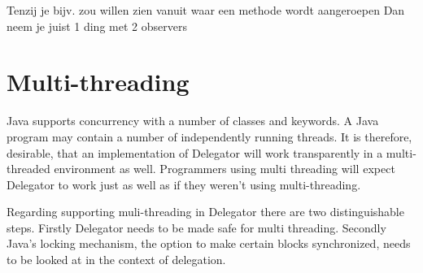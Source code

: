 \documentclass[a4paper,12pt]{book}
\begin{document}
Tenzij je bijv. zou willen zien vanuit waar een methode wordt aangeroepen Dan neem je juist 1 ding met 2 observers




\chapter{Multi-threading}
Java supports concurrency with a number of classes and keywords. A Java program may contain a number of independently running threads. It is therefore, desirable, that an implementation of Delegator will work transparently in a multi-threaded environment as well. Programmers using multi threading will expect Delegator to work just as well as if they weren't using multi-threading.

Regarding supporting muli-threading in Delegator there are two distinguishable steps. Firstly Delegator needs to be made safe for multi threading. Secondly Java's locking mechanism, the option to make certain blocks synchronized, needs to be looked at in the context of delegation.
\end{document}
